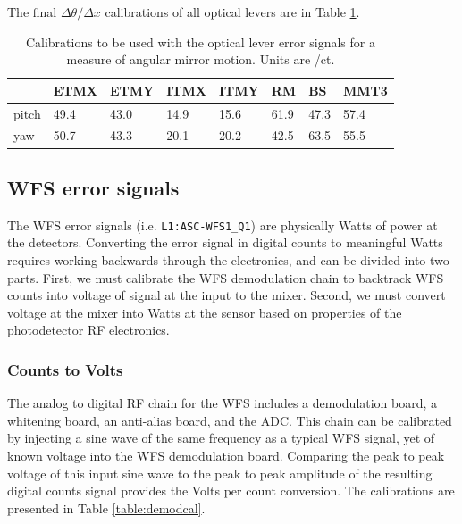The final $\Delta\theta / \Delta x$ calibrations of all optical levers
are in Table \ref{table:oplevcal}. 

\begin{table}
\centering
\caption[Optical lever calibrations]{Calibrations to be used
  with the optical lever error signals 
  for a measure of angular mirror motion. Units are \microrad/ct.}
\begin{tabular}{l l l l l l l l}
\hline
        & ETMX & ETMY & ITMX & ITMY & RM & BS & MMT3 \\
\hline
pitch & 49.4 & 43.0 & 14.9 & 15.6 & 61.9 & 47.3 & 57.4 \\
yaw & 50.7 & 43.3 & 20.1 & 20.2 & 42.5 & 63.5 & 55.5 \\
\hline
\end{tabular}
\label{table:oplevcal}
\end{table}





\subsection{WFS error signals}
The WFS error signals (i.e. \texttt{L1:ASC-WFS1\_Q1}) are physically Watts of power at the
detectors. Converting the error signal in digital counts to meaningful
Watts requires working backwards through the electronics, and can be
divided into two parts. First, we must calibrate the WFS demodulation
chain to backtrack WFS counts into voltage of signal at the input to
the mixer. Second, we must convert voltage at the mixer into Watts at
the sensor based on properties of the photodetector RF electronics.

\subsubsection{Counts to Volts} 
The analog to digital RF chain for the WFS includes a demodulation
board, a whitening board, an anti-alias board, and the ADC. This chain
can be calibrated by injecting a sine wave of the same frequency as a
typical WFS signal, yet of known voltage into the WFS demodulation
board. Comparing the peak to peak voltage of this input sine wave to
the peak to peak amplitude of the resulting digital counts signal
provides the Volts per count conversion. The calibrations are
presented in Table \ref{table:demodcal}.

